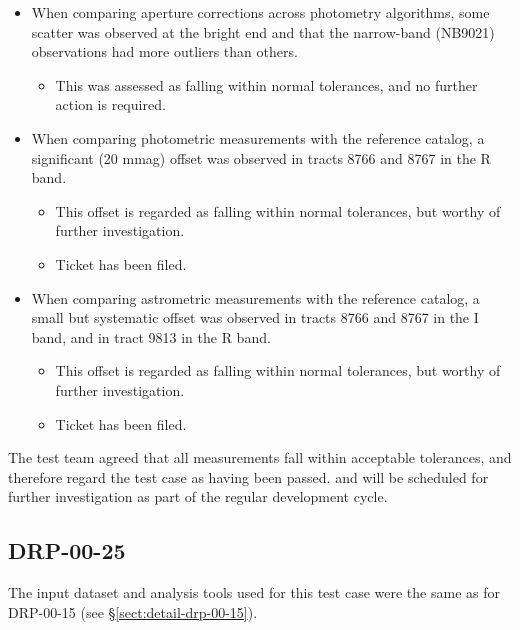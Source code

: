 \documentclass[DM,STR,toc]{lsstdoc}
\begin{document}
\begin{itemize}

  \item{When comparing aperture corrections across photometry algorithms, some scatter was observed at the bright end and that the narrow-band (NB9021) observations had more outliers than others.
    \begin{itemize}
      \item{This was assessed as falling within normal tolerances, and no further action is required.}
    \end{itemize}
  }

  \item{When comparing photometric measurements with the reference catalog, a significant (20 mmag) offset was observed in tracts 8766 and 8767 in the R band.
    \begin{itemize}
      \item{This offset is regarded as falling within normal tolerances, but worthy of further investigation.}
      \item{Ticket  has been filed.}
    \end{itemize}
  }

  \item{When comparing astrometric measurements with the reference catalog, a small but systematic offset was observed in tracts 8766 and 8767 in the I band, and in tract 9813 in the R band.
    \begin{itemize}
      \item{This offset is regarded as falling within normal tolerances, but worthy of further investigation.}
      \item{Ticket  has been filed.}
    \end{itemize}
  }

\end{itemize}

The test team agreed that all measurements fall within acceptable tolerances, and therefore regard the test case as having been passed.
 and  will be scheduled for further investigation as part of the regular development cycle.

\subsection{DRP-00-25}
\label{sect:detail-drp-00-25}

The input dataset and analysis tools used for this test case were the same as for DRP-00-15 (see \S\ref{sect:detail-drp-00-15}).
\end{document}
